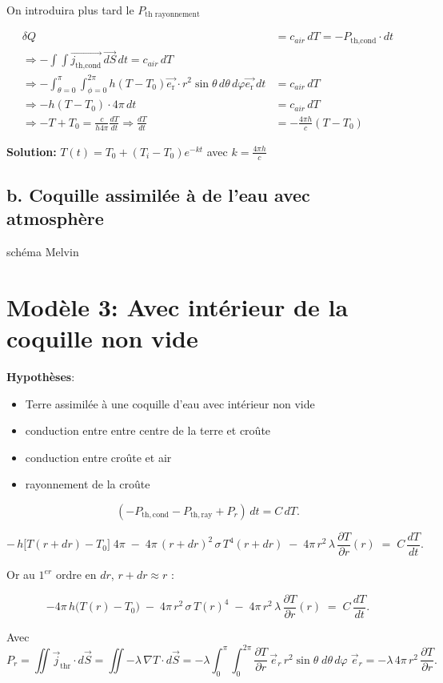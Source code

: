 \documentclass[a4paper,12pt]{article}
\begin{document}
On introduira plus tard le \(P_{\text{th rayonnement}}\)

\begin{align*}
\delta Q &= c_{air}\, dT = -P_{\text{th,cond}} \cdot dt \\
\Rightarrow -\int \int \vec{j_{\text{th,cond}}}\, \vec{dS}\,dt = c_{air}\, dT \\
\Rightarrow -\int_{\theta=0}^\pi \int_{\phi=0}^{2\pi} h(T - T_0) \vec{e_{\text{r}}}\cdot r^2 \sin\theta\, d\theta\, d\varphi \vec{e_{\text{r}}}\, dt &=  c_{air}\, dT  \\
\Rightarrow -h(T - T_0) \cdot 4\pi\, dt &= c_{air}\, dT \\
\Rightarrow -T + T_0 = \frac{c}{h 4\pi} \frac{dT}{dt} \Rightarrow \frac{dT}{dt} &= -\frac{4\pi h}{c}(T - T_0)
\end{align*}

\vspace{0.5cm}

\textbf{Solution:} 
$T(t) = T_0 + (T_i - T_0)e^{-kt}$ \quad avec $k = \frac{4\pi h}{c}$

\subsection{b. Coquille assimilée à de l'eau avec atmosphère }
schéma Melvin

\section{Modèle 3: Avec intérieur de la coquille non vide }
\textbf{Hypothèses}:
\begin{itemize}
    \item Terre assimilée à une coquille d'eau avec intérieur non vide 
    \item  conduction entre entre centre de la terre et croûte 
    \item  conduction entre croûte et air 
    \item  rayonnement de la croûte
    
    
    
\end{itemize}


\[
(-P_{\mathrm{th,cond}} - P_{\mathrm{th,ray}} + P_r)\,dt = C\,dT.
\]

\[
-\,h\bigl[T(r+dr)-T_0\bigr]\;4\pi
\;-\;4\pi\,(r+dr)^2\,\sigma\,T^4(r+dr)
\;-\;4\pi\,r^2\,\lambda\,\frac{\partial T}{\partial r}(r)
\;=\;C\,\frac{dT}{dt}.
\]

\medskip

Or au \(1^{er}\) ordre en \(dr\), \(r+dr\approx r\) :

\[
-4\pi\,h\bigl(T(r)-T_0\bigr)
\;-\;4\pi\,r^2\,\sigma\,T(r)^4
\;-\;4\pi\,r^2\,\lambda\,\frac{\partial T}{\partial r}(r)
\;=\;C\,\frac{dT}{dt}.
\]

\medskip

Avec
\[
P_{r}
= \iint\vec j_{\mathrm{thr}}\cdot d\vec S
= \iint -\lambda\,\nabla T\cdot d\vec S
= -\lambda
  \int_{0}^{\pi}\!\!\int_{0}^{2\pi}
    \frac{\partial T}{\partial r}\,\vec e_{r}\,
    r^2\sin\theta\;d\theta\,d\varphi\;\vec e_{r}
= -\lambda\,4\pi\,r^2\,\frac{\partial T}{\partial r}.
\]


 
\vspace{1cm}
\end{document}
